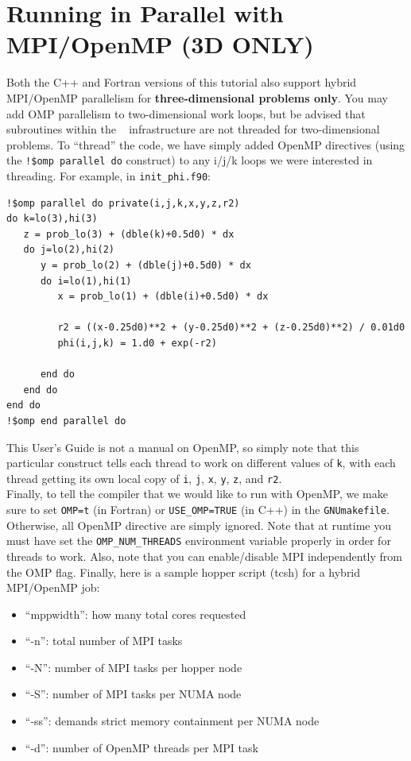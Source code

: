 \section{Running in Parallel with MPI/OpenMP (3D ONLY)}\label{Sec:OpenMP}
Both the C++ and Fortran versions of this tutorial also support hybrid MPI/OpenMP parallelism for {\bf three-dimensional problems only}.
You may add OMP parallelism to two-dimensional work loops, but be advised that subroutines within the \BoxLib~ infrastructure 
are not threaded for two-dimensional problems.
To ``thread'' the code, we have simply added OpenMP directives (using the {\tt !\$omp parallel do} 
construct) to any i/j/k loops we were interested in threading.  For example, in {\tt init\_phi.f90}:
\begin{lstlisting}[backgroundcolor=\color{light-green}]
!$omp parallel do private(i,j,k,x,y,z,r2)
do k=lo(3),hi(3)
   z = prob_lo(3) + (dble(k)+0.5d0) * dx
   do j=lo(2),hi(2)
      y = prob_lo(2) + (dble(j)+0.5d0) * dx
      do i=lo(1),hi(1)
         x = prob_lo(1) + (dble(i)+0.5d0) * dx

         r2 = ((x-0.25d0)**2 + (y-0.25d0)**2 + (z-0.25d0)**2) / 0.01d0
         phi(i,j,k) = 1.d0 + exp(-r2)
 
      end do
   end do
end do
!$omp end parallel do
\end{lstlisting}
This User's Guide is not a manual on OpenMP, so simply note that this particular 
construct tells each thread to work on different values of {\tt k}, with each 
thread getting its own local copy of {\tt i}, {\tt j}, {\tt x}, {\tt y}, {\tt z}, and {\tt r2}.\\

Finally, to tell the compiler that we would like to run with OpenMP, we make sure to
set {\tt OMP=t} (in Fortran) or {\tt USE\_OMP=TRUE} (in C++) in the {\tt GNUmakefile}.
Otherwise, all OpenMP directive are
simply ignored.  Note that at runtime you must have set the 
{\tt OMP\_NUM\_THREADS} environment variable properly in order for threads to work.
Also, note that you can enable/disable MPI independently from the OMP flag.  Finally,
here is a sample hopper script (tcsh) for a hybrid MPI/OpenMP job:

\begin{itemize}
\item ``mppwidth'': how many total cores requested
\item ``-n'': total number of MPI tasks
\item ``-N'': number of MPI tasks per hopper node
\item ``-S'': number of MPI tasks per NUMA node
\item ``-ss'': demands strict memory containment per NUMA node
\item ``-d'': number of OpenMP threads per MPI task
\end{itemize}
